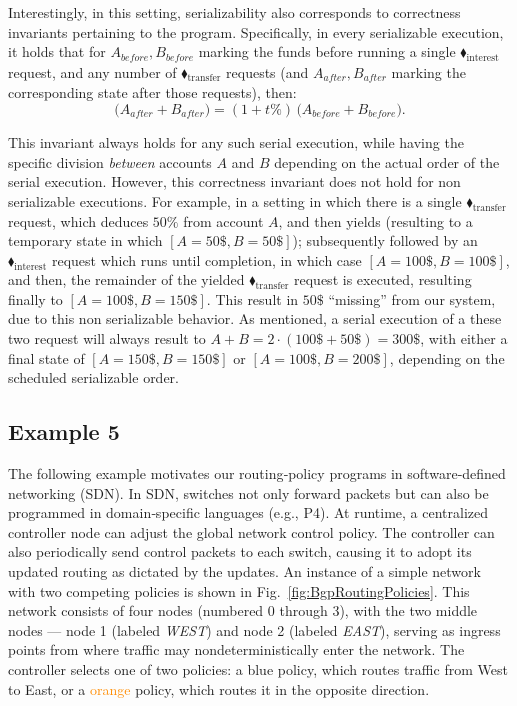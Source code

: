 Interestingly, in this setting, serializability also corresponds to correctness invariants pertaining to the program. Specifically, in every serializable execution, it holds that for $A_{\textit{before}},B_{\textit{before}}$ marking the funds before running a single {\color{ForestGreen}$\blacklozenge_\text{interest}$} request, and any number of {\color{ForestGreen}$\blacklozenge_\text{transfer}$} requests (and $A_{\textit{after}},B_{\textit{after}}$ marking the corresponding state after those requests), then:
\[
\bigl(A_{\mathit{after}} + B_{\mathit{after}}\bigr)
= (1 + t\%)\,\bigl(A_{\mathit{before}} + B_{\mathit{before}}\bigr).
\]

This invariant always holds for any such serial execution, while having the specific division \textit{between} accounts $A$ and $B$ depending on the actual order of the serial execution.
%
However, this correctness invariant does not hold for non serializable executions. For example, in a setting in which there is a single {\color{ForestGreen}$\blacklozenge_\text{transfer}$} request, which deduces $50\%$ from account $A$, and then yields (resulting to a temporary state in which $[A=50\$,B=50\$]$); subsequently followed by an  {\color{ForestGreen}$\blacklozenge_\text{interest}$} request which runs until completion, in which case  $[A=100\$,B=100\$]$, and then, the remainder of the yielded {\color{ForestGreen}$\blacklozenge_\text{transfer}$} request is executed, resulting finally to $[A=100\$, B=150\$]$.  This result in $50\$$ ``missing'' from our system, due to this non serializable behavior.
%
As mentioned, a serial execution of a these two request will always result to 
$A+B=2\cdot (100\$+50\$)=300\$$, with either a final state of $[A=150\$, B=150\$]$ or $[A=100\$, B=200\$]$, depending on the scheduled serializable order.




\subsection{Example 5}

The following example motivates our routing‐policy programs in software‐defined networking (SDN). In SDN, switches not only forward packets but can also be programmed in domain‐specific languages (e.g., P4). At runtime, a centralized controller node can adjust the global network control policy. The controller can also periodically send control packets to each switch, causing it to adopt its updated routing as dictated by the updates.
%
An instance of a simple network with two competing policies is shown in Fig.~\ref{fig:BgpRoutingPolicies}. This network consists of four nodes (numbered 0 through 3), with the two middle nodes --- node 1 (labeled \textit{WEST}) and node 2 (labeled \textit{EAST}), serving as ingress points from where traffic may nondeterministically enter the network. The controller selects one of two policies: a \textcolor{NavyBlue}{blue} policy, which routes traffic from West to East, or a \textcolor{darkorange}{orange} policy, which routes it in the opposite direction.


